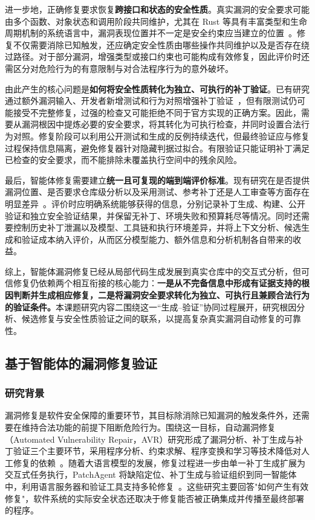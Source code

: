 进一步地，正确修复要求恢复\textbf{跨接口和状态的安全性质}。真实漏洞的安全要求可能由多个函数、对象状态和调用阶段共同维护，尤其在 Rust 等具有丰富类型和生命周期机制的系统语言中，漏洞表现位置并不一定是安全约束应当建立的位置~\cite{jung2018rustbelt,qin2020rust}。修复不仅需要消除已知触发，还应确定安全性质由哪些操作共同维护以及是否存在绕过路径。对于部分漏洞，增强类型或接口约束也可能构成有效修复，因此评价时还需区分对危险行为的有意限制与对合法程序行为的意外破坏。

由此产生的核心问题是\textbf{如何将安全性质转化为独立、可执行的补丁验证}。已有研究通过额外漏洞输入、开发者新增测试和行为对照增强补丁验证~\cite{yu2026pvbench,shen2026patchbench}，但有限测试仍可能接受不完整修复，过强的检查又可能拒绝不同于官方实现的正确方案。因此，需要从漏洞根因中提炼必要的安全要求，将其转化为可执行检查，并同时设置合法行为对照。修复阶段可以利用公开测试和生成的反例持续迭代，但最终验证应与修复过程保持信息隔离，避免修复器针对隐藏判据过拟合。有限验证只能证明补丁满足已检查的安全要求，而不能排除未覆盖执行空间中的残余风险。

最后，智能体修复需要建立\textbf{统一且可复现的端到端评价标准}。现有研究在是否提供漏洞位置、是否要求仓库级分析以及采用测试、参考补丁还是人工审查等方面存在明显差异~\cite{secbench,shen2026patchbench}。评价时应明确系统能够获得的信息，分别记录补丁生成、构建、公开验证和独立安全验证结果，并保留无补丁、环境失败和预算耗尽等情况。同时还需要控制历史补丁泄漏以及模型、工具链和执行环境差异，并将上下文分析、候选生成和验证成本纳入评价，从而区分模型能力、额外信息和分析机制各自带来的收益。

综上，智能体漏洞修复已经从局部代码生成发展到真实仓库中的交互式分析，但可信修复仍依赖两个相互衔接的核心能力：\textbf{一是从不完备信息中形成有证据支持的根因判断并生成相应修复，二是将漏洞安全要求转化为独立、可执行且兼顾合法行为的验证条件。}本课题研究内容二围绕这一“生成--验证”协同过程展开，研究根因分析、候选修复与安全性质验证之间的联系，以提高复杂真实漏洞自动修复的可靠性。

\subsection{基于智能体的漏洞修复验证}

\subsubsection{研究背景}

漏洞修复是软件安全保障的重要环节，其目标除消除已知漏洞的触发条件外，还需要在维持合法功能的前提下阻断危险行为。围绕这一目标，自动漏洞修复（Automated Vulnerability Repair，AVR）研究形成了漏洞分析、补丁生成与补丁验证三个主要环节，采用程序分析、约束求解、程序变换和学习等技术降低对人工修复的依赖~\cite{sokavr}。随着大语言模型的发展，修复过程进一步由单一补丁生成扩展为交互式任务执行，PatchAgent 将缺陷定位、补丁生成与验证组织到同一智能体中，利用语言服务器和验证工具支持多轮修复~\cite{patchagent}。这些研究主要回答"如何产生有效修复"，软件系统的实际安全状态还取决于修复能否被正确集成并传播至最终部署的程序。


